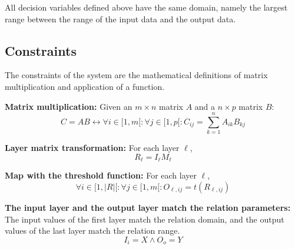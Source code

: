 \documentclass[a4paper, 10pt]{article}
\begin{document}
All decision variables defined above have the same domain, namely the
largest range between the range of the input data and the output data.


\subsection*{Constraints}
The constraints of the system are the mathematical definitions of matrix
multiplication and application of a function.

\begin{description}
    \item{\textbf{Matrix multiplication:}} Given an $m \times n$ matrix $A$ and a $n
        \times p$ matrix $B$: 
        \begin{equation*}
            C = AB \leftrightarrow 
            \forall i \in [1, m[: \forall j \in [1, p[: C_{ij} = \sum_{k = 1}^{n}A_{ik}B_{kj}
        \end{equation*}
    \item{\textbf{Layer matrix transformation:}} For each layer $\ell$,
        \begin{equation*}
            R_\ell = I_\ell M_\ell
        \end{equation*}

    \item{\textbf{Map with the threshold function:}} For each layer $\ell$,
        \begin{equation*}
            \forall i \in [1, |R|[: 
            \forall j \in [1, m[:
                    O_{\ell, ij} = t(R_{\ell, ij})
        \end{equation*}
    \item{\textbf{The input layer and the output layer match the relation
        parameters:}} The input values of the first layer match the relation
        domain, and the output values of the last layer match the relation
        range.
        \begin{equation*}
            I_i = X \land O_o = Y
        \end{equation*}
\end{description}
\end{document}
